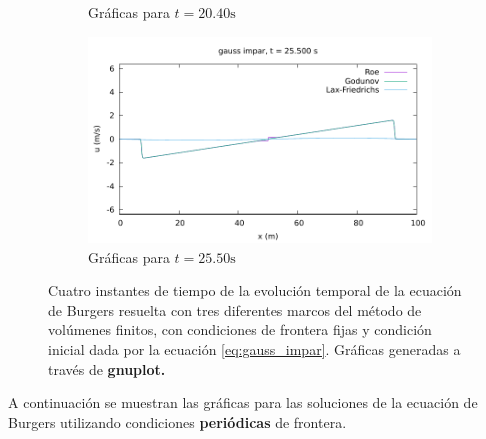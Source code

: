 \documentclass[12pt]{article}
\begin{document}
\begin{figure}[h]
\begin{subfigure}[b]{0.49\textwidth}
			\caption*{Gráficas para $t=20.40\unit{\second}$}
			\label{fig:gauss_impar-fija3}
		\end{subfigure}
		\vfill
		\begin{subfigure}[b]{0.49\textwidth}
			\includegraphics[width=\textwidth]{../burgers1DVF/results/sol_fijas/gauss_impar/850.pdf}
			\caption*{Gráficas para $t=25.50\unit{\second}$}
			\label{fig:gauss_impar-fija4}
		\end{subfigure}
		\caption{Cuatro instantes de tiempo de la evolución temporal de la ecuación de Burgers resuelta con tres diferentes marcos del método de volúmenes finitos, con condiciones de frontera fijas y condición inicial dada por la ecuación \ref{eq:gauss_impar}. Gráficas generadas a través de \textbf{gnuplot.}}
		\label{fig:instantes-gauss_impar-fija}
	\end{figure}
	\clearpage
	\newpage
	A continuación se muestran las gráficas para las soluciones de la ecuación de Burgers utilizando condiciones \textbf{periódicas} de frontera.
\end{document}
